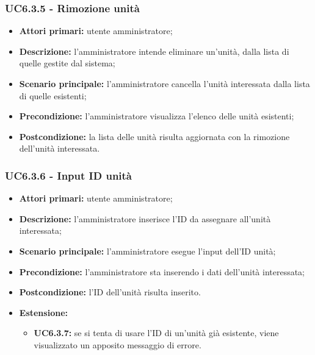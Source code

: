 \subsubsection{UC6.3.5 - Rimozione unità}
	\begin{itemize}
		\item \textbf{Attori primari:} utente amministratore;
		\item \textbf{Descrizione:} l'amministratore intende eliminare un'unità, dalla lista di quelle gestite dal sistema;
		\item \textbf{Scenario principale:} l'amministratore cancella l'unità interessata dalla lista di quelle esistenti;
		\item \textbf{Precondizione:} l'amministratore visualizza l'elenco delle unità esistenti;
		\item \textbf{Postcondizione:} la lista delle unità risulta aggiornata con la rimozione dell'unità interessata.
	\end{itemize}

\subsubsection{UC6.3.6 - Input ID unità}
	\begin{itemize}
		\item \textbf{Attori primari:} utente amministratore;
		\item \textbf{Descrizione:} l'amministratore inserisce l'ID da assegnare all'unità interessata;
		\item \textbf{Scenario principale:} l'amministratore esegue l'input dell'ID unità;
		\item \textbf{Precondizione:} l'amministratore sta inserendo i dati dell'unità interessata;
		\item \textbf{Postcondizione:} l'ID dell'unità risulta inserito.
		\item \textbf{Estensione:}
		\begin{itemize}
			\item \textbf{UC6.3.7:} se si tenta di usare l'ID di un'unità già esistente, viene visualizzato un apposito messaggio di errore.
		\end{itemize}
	\end{itemize}


